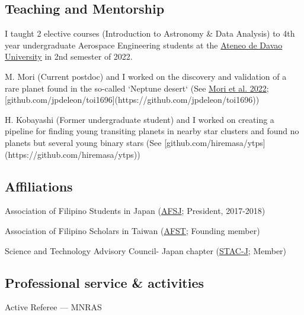 \documentclass[12pt,letterpaper]{article}
\begin{document}
\subsection{Teaching and Mentorship}
\begin{list}{}{\cvlist}
    \item I taught 2 elective courses (Introduction to Astronomy & Data Analysis) to 4th year undergraduate Aerospace Engineering students at the \href{http://sea.addu.edu.ph/programs/aerospace-engineering/}{Ateneo de Davao University} in 2nd semester of 2022. 
    \item M. Mori (Current postdoc) and I worked on the discovery and validation of a rare planet found in the so-called `Neptune desert` (See \href{https://ui.adsabs.harvard.edu/abs/2022AJ....163..298M/abstract}{Mori et al. 2022}; [github.com/jpdeleon/toi1696](https://github.com/jpdeleon/toi1696))
    \item H. Kobayashi (Former undergraduate student) and I worked on creating a pipeline for finding young transiting planets in nearby star clusters and found no planets but several young binary stars (See [github.com/hiremasa/ytps](https://github.com/hiremasa/ytps))
\end{list}

\subsection{Affiliations}
\begin{list}{}{\cvlist}
    \item Association of Filipino Students in Japan (\href{https://www.facebook.com/afsjpage/}{AFSJ}; President, 2017-2018)
    \item Association of Filipino Scholars in Taiwan  (\href{https://www.facebook.com/AssocIskolar/}{AFST}; Founding member)
    \item Science and Technology Advisory Council- Japan chapter (\href{https://www.facebook.com/profile.php?id=100083271798519}{STAC-J}; Member)
\end{list}

\subsection{Professional service \& activities}
\begin{list}{}{\cvlist}
  \item Active Referee ---
        MNRAS
\end{list}
\end{document}
